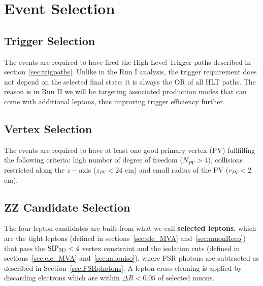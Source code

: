 \section{Event Selection}
\label{sec:eventsel}


\subsection{Trigger Selection}
\label{sec:HLTsel}

The events are required to have fired the High-Level Trigger paths described in section~\ref{sec:trigpaths}. Unlike in the Run I analysis, the trigger requirement does not depend on the selected final state: it is always the OR of all HLT paths. The reason is in Run II we will be targeting associated production modes that can come with additional leptons, thus improving trigger efficiency further.


\subsection{Vertex Selection}
\label{sec:vertexsel}

The events are required to have at least one good primary
vertex (PV) fullfilling the following criteria: high number of degree
of freedom ($N_{PV}>4$), collisions restricted along the $z-$axis
($z_{PV}<24$ cm) and small radius of the PV ($r_{PV}<2$ cm).


\subsection{ZZ Candidate Selection}
\label{sec:zzcandsel}

The four-lepton candidates are built from what we call {\bf selected leptons}, which  
are the tight leptons (defined in sections~\ref{sec:ele_MVA} and~\ref{sec:muonReco}) that pass the ${\rm SIP_{3D}} < 4$ vertex constraint
and the isolation cuts (defined in sections~\ref{sec:ele_MVA} and~\ref{sec:muoniso}), 
where FSR photons are subtracted as described in Section~\ref{sec:FSRphotons}.
A lepton cross cleaning is applied 
by discarding electrons which are within $\Delta R < 0.05$ of selected muons. 



